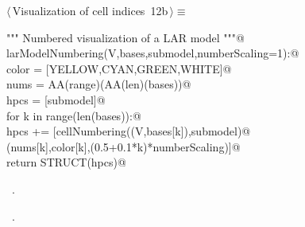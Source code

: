 \documentclass[11pt,oneside]{article}	%
\begin{document}
\begin{flushleft} \small \label{scrap23}
\protect{}$\langle\,$Visualization of cell indices\nobreak\ {\footnotesize 12b}$\,\rangle\equiv$
\vspace{-1ex}
\begin{list}{}{} \item
\mbox{}\verb@""" Numbered visualization of a LAR model """@\\
\mbox{}\verb@def larModelNumbering(V,bases,submodel,numberScaling=1):@\\
\mbox{}\verb@   color = [YELLOW,CYAN,GREEN,WHITE]@\\
\mbox{}\verb@   nums = AA(range)(AA(len)(bases))@\\
\mbox{}\verb@   hpcs = [submodel]@\\
\mbox{}\verb@   for k in range(len(bases)):@\\
\mbox{}\verb@      hpcs += [cellNumbering((V,bases[k]),submodel)@\\
\mbox{}\verb@               (nums[k],color[k],(0.5+0.1*k)*numberScaling)]@\\
\mbox{}\verb@   return STRUCT(hpcs)@\\
\mbox{}\verb@@{\NWsep}
\end{list}
\vspace{-1ex}
\footnotesize\addtolength{\baselineskip}{-1ex}
\begin{list}{}{\setlength{\itemsep}{-\parsep}\setlength{\itemindent}{-\leftmargin}}
\item \NWtxtMacroDefBy\ .
\item \NWtxtMacroRefIn\ .
\end{list}
\end{flushleft}
\end{document}
